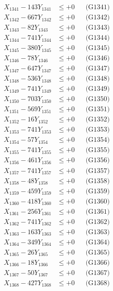 \documentclass[a4paper,10pt]{article}
\begin{document}
{\begin{align}
\allowbreak
X_{1341} - 143Y_{1341} &\leq +0 && \text{(G1341)} \\
X_{1342} - 667Y_{1342} &\leq +0 && \text{(G1342)} \\
X_{1343} - 82Y_{1343} &\leq +0 && \text{(G1343)} \\
X_{1344} - 741Y_{1344} &\leq +0 && \text{(G1344)} \\
X_{1345} - 380Y_{1345} &\leq +0 && \text{(G1345)} \\
X_{1346} - 78Y_{1346} &\leq +0 && \text{(G1346)} \\
X_{1347} - 647Y_{1347} &\leq +0 && \text{(G1347)} \\
X_{1348} - 536Y_{1348} &\leq +0 && \text{(G1348)} \\
X_{1349} - 741Y_{1349} &\leq +0 && \text{(G1349)} \\
X_{1350} - 703Y_{1350} &\leq +0 && \text{(G1350)} \\
\allowbreak
X_{1351} - 569Y_{1351} &\leq +0 && \text{(G1351)} \\
X_{1352} - 16Y_{1352} &\leq +0 && \text{(G1352)} \\
X_{1353} - 741Y_{1353} &\leq +0 && \text{(G1353)} \\
X_{1354} - 57Y_{1354} &\leq +0 && \text{(G1354)} \\
X_{1355} - 741Y_{1355} &\leq +0 && \text{(G1355)} \\
X_{1356} - 461Y_{1356} &\leq +0 && \text{(G1356)} \\
X_{1357} - 741Y_{1357} &\leq +0 && \text{(G1357)} \\
X_{1358} - 48Y_{1358} &\leq +0 && \text{(G1358)} \\
X_{1359} - 459Y_{1359} &\leq +0 && \text{(G1359)} \\
X_{1360} - 418Y_{1360} &\leq +0 && \text{(G1360)} \\
\allowbreak
X_{1361} - 256Y_{1361} &\leq +0 && \text{(G1361)} \\
X_{1362} - 741Y_{1362} &\leq +0 && \text{(G1362)} \\
X_{1363} - 163Y_{1363} &\leq +0 && \text{(G1363)} \\
X_{1364} - 349Y_{1364} &\leq +0 && \text{(G1364)} \\
X_{1365} - 26Y_{1365} &\leq +0 && \text{(G1365)} \\
X_{1366} - 18Y_{1366} &\leq +0 && \text{(G1366)} \\
X_{1367} - 50Y_{1367} &\leq +0 && \text{(G1367)} \\
X_{1368} - 427Y_{1368} &\leq +0 && \text{(G1368)} \\

\end{align}}
\end{document}
